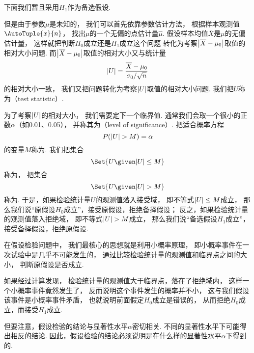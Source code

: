 下面我们暂且采用\(H_1\)作为备选假设.

但是由于参数\(\mu\)是未知的，
我们可以首先依靠参数估计方法，
根据样本观测值\(\AutoTuple{x}{n}\)，
找出\(\mu\)的一个无偏的点估计量\(\hat{\mu}\).
假设样本均值\(\overline{X}\)是\(\mu\)的无偏估计量，
这样就把判断\(H_0\)成立还是\(H_1\)成立这个问题
转化为考察\(\abs{\overline{X}-\mu_0}\)取值的相对大小问题.
而\(\abs{\overline{X}-\mu_0}\)取值的相对大小又与统计量\[
	\abs{U} = \frac{\overline{X}-\mu_0}{\sigma_0/\sqrt{n}}
\]的相对大小一致，
我们又把问题转化为考察\(\abs{U}\)取值的相对大小问题.
我们把\(U\)称为（test statistic）.

为了考察\(\abs{U}\)的相对大小，
我们需要定下一个临界值.
通常我们会取一个很小的正数\(\alpha\)（如0.01、0.05），
并称其为（level of significance）.
把适合概率方程\[
	P(\abs{U} > M) = \alpha
\]的变量\(M\)称为.
我们把集合\[
	\Set{ U \given \abs{U} \leq M }
\]称为，
把集合\[
	\Set{ U \given \abs{U} > M }
\]称为.
于是，如果检验统计量\(U\)的观测值落入接受域，
即不等式\(\abs{U} \leq M\)成立，
那么我们说“原假设\(H_0\)成立”，接受原假设，拒绝备择假设；
反之，如果检验统计量的观测值落入拒绝域，
即不等式\(\abs{U} > M\)成立，
那么我们说“备选假设\(H_1\)成立”，接受备择假设，拒绝原假设.


在假设检验问题中，
我们最核心的思想就是利用小概率原理，
即小概率事件在一次试验中是几乎不可能发生的，
通过比较检验统计量的观测值和临界点之间的大小，
判断原假设是否成立.

如果经过计算发现，
检验统计量的观测值大于临界点，落在了拒绝域内，
这样一个小概率事件竟然发生了，
反而说明这个事件发生的概率并不小，
这与我们假设该事件是小概率事件矛盾，
也就说明前面假定\(H_0\)成立是错误的，
从而拒绝\(H_0\)成立，而接受\(H_1\)成立.

但要注意，假设检验的结论与显著性水平\(\alpha\)密切相关.
不同的显著性水平下可能得出相反的结论.
因此，假设检验的结论必须说明是在什么样的显著性水平\(\alpha\)下得到的.

